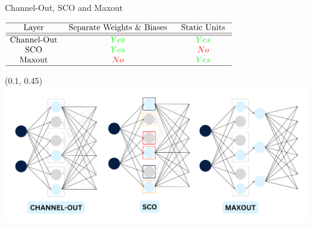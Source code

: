 \documentclass[UKenglish]{beamer}
\begin{document}
\begin{frame}{Channel-Out, SCO and Maxout}
    \vspace{0.5cm}
    \center
        \begin{table}
            $
            \begin{array}{ccc}
                \hline \text { Layer } & \text { Separate Weights $\&$ Biases } & \text { Static Units }\\
                \hline\hline\text{Channel-Out} & \textcolor{green}{Yes} &  \textcolor{green}{Yes}  \\
                \text { SCO } &  \textcolor{green}{Yes} &  \textcolor{red}{No}  \\
                \text{ Maxout } &  \textcolor{red}{No} &  \textcolor{green}{Yes}   \\
                \hline
            \end{array}
            $
        \end{table}
    \begin{textblock}{0.8}(0.1, 0.45)
        \includegraphics[width = \textwidth]{figures/EnsembleComp}
    \end{textblock}
\end{frame}
\end{document}
